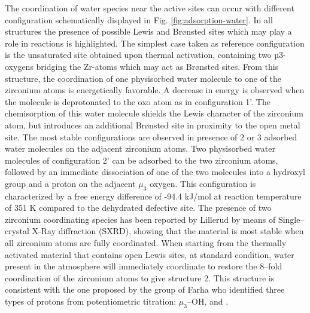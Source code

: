 \npar
The coordination of water species near the active sites can occur with different configuration schematically displayed in Fig. \ref{fig:adsorption-water}. 
In all structures the presence of possible Lewis and Brønsted sites which may play a role in reactions is highlighted. The simplest case taken as reference configuration is the unsaturated site obtained upon thermal activation, containing two µ3-oxygens bridging the Zr-atoms which may act as Br\o{}nsted sites. From this structure, the coordination of one physisorbed water molecule to one of the zirconium atoms is energetically favorable. A decrease in energy is observed when the molecule is deprotonated to the oxo atom as in configuration 1’. The chemisorption of this water molecule shields the Lewis character of the zirconium atom, but introduces an additional Br\o{}nsted site in proximity to the open metal site. The most stable configurations are observed in presence of 2 or 3 adsorbed water molecules on the adjacent zirconium atoms. Two physisorbed water molecules of configuration 2’ can be adsorbed to the two zirconium atoms, followed by an immediate dissociation of one of the two molecules into a hydroxyl group and a proton on the adjacent $\mu_3$ oxygen. This configuration is characterized by a free energy difference of -94.4 kJ/mol at reaction temperature of 351 K compared to the dehydrated defective site. The presence of two zirconium coordinating species has been reported by Lillerud \cite{oien2014detailed} by means of Single--crystal X-Ray diffraction (SXRD), showing that the material is most stable when all zirconium atoms are fully coordinated. When starting from the thermally activated material that contains open Lewis sites, at standard condition, water present in the atmosphere will immediately coordinate to restore the 8--fold coordination of the zirconium atoms to give structure 2. This structure is consistent with the one proposed by the group of Farha \cite{klet2016evaluation} who identified three types of protons from potentiometric titration:  $\mu_3$--OH,  and . 
